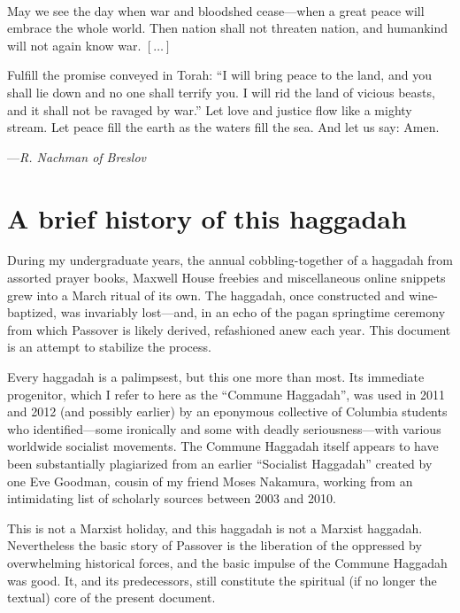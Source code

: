 \documentclass[letter,11pt,openany]{memoir}
\newcommand{\HgEllipsis}{\ensuremath{\left[\ldots\right]}}
\newcommand{\HgSource}[1]{\hfill{\small---\itshape{#1}}}
\newcommand{\HgFill}{
\vfill \hrule 
\vfill}
\newenvironment{HgEnglish}{\strut\\
\noindent}{\vspace{1em}}
\begin{document}
%
%
\vfill
\begin{HgEnglish}
	May we see the day when war and bloodshed cease---when a great peace will embrace the whole world. Then nation shall not threaten nation, and humankind will not again know war. \HgEllipsis{}
	
	Fulfill the promise conveyed in Torah: ``I will bring peace to the land, and you shall lie down and no one shall terrify you. I will rid the land of vicious beasts, and it shall not be ravaged by war.'' Let love and justice flow like a mighty stream. Let peace fill the earth as the waters fill the sea. And let us say: Amen. 
	
	\HgSource{R. Nachman of Breslov} 
\end{HgEnglish}

\vfill

\chapter*{A brief history of this haggadah}

During my undergraduate years, the annual cobbling-together of a haggadah from assorted prayer books, Maxwell House freebies and miscellaneous online snippets grew into a March ritual of its own. The haggadah, once constructed and wine-baptized, was invariably lost---and, in an echo of the pagan springtime ceremony from which Passover is likely derived, refashioned anew each year. This document is an attempt to stabilize the process.

Every haggadah is a palimpsest, but this one more than most. Its immediate progenitor, which I refer to here as the ``Commune Haggadah'', was used in 2011 and 2012 (and possibly earlier) by an eponymous collective of Columbia students who identified---some ironically and some with deadly seriousness---with various worldwide socialist movements. The Commune Haggadah itself appears to have been substantially plagiarized from an earlier ``Socialist Haggadah'' created by one Eve Goodman, cousin of my friend Moses Nakamura, working from an intimidating list of scholarly sources between 2003 and 2010.

This is not a Marxist holiday, and this haggadah is not a Marxist haggadah. Nevertheless the basic story of Passover is the liberation of the oppressed by overwhelming historical forces, and the basic impulse of the Commune Haggadah was good. It, and its predecessors, still constitute the spiritual (if no longer the textual) core of the present document. 
\end{document}
